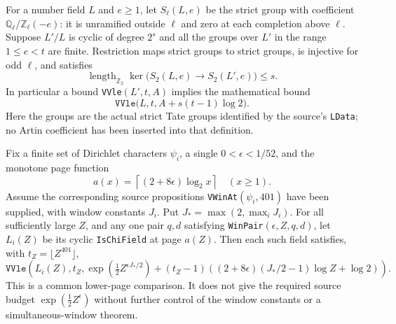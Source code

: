 \begin{proposition}
\label{AC-G31}
For a number field $L$ and $e\geq1$, let
$S_\ell(L,e)$ be the strict group with coefficient
$\mathbb Q_\ell/\mathbb Z_\ell(-e)$: it is unramified
outside $\ell$ and zero at each completion above $\ell$.
Suppose $L'/L$ is cyclic of degree $2^s$ and all the
groups over $L'$ in the range $1\leq e<t$ are finite.
Restriction maps strict groups to strict groups, is
injective for odd $\ell$, and satisfies
\[
 \operatorname{length}_{\mathbb Z_2}
       \ker\bigl(S_2(L,e)\longrightarrow S_2(L',e)\bigr)
                  \leq s.                            \tag{G31.1}
\]
In particular a bound \texttt{VVle}$(L',t,A)$ implies
the mathematical bound
\[
 \texttt{VVle}\bigl(L,t,A+s(t-1)\log2\bigr).         \tag{G31.2}
\]
Here the groups are the actual strict Tate groups identified
by the source's \texttt{LData}; no Artin coefficient has
been inserted into that definition.

Fix a finite set of Dirichlet characters $\psi_i$, a single
$0<\epsilon<1/52$, and the monotone page function
\[
 a(x)=\left\lceil(2+8\epsilon)\log_2 x\right\rceil
                         \quad(x\geq1).
\]
Assume the corresponding source propositions
\texttt{VWinAt}$(\psi_i,401)$ have been supplied, with
window constants $J_i$.  Put $J_* =\max(2,\max_i J_i)$.
For all sufficiently large $Z$, and any one pair $q,d$
satisfying \texttt{WinPair}$(\epsilon,Z,q,d)$, let
$L_i(Z)$ be its cyclic \texttt{IsChiField} at page $a(Z)$.
Then each such field satisfies, with
$t_Z=\lfloor Z^{401}\rfloor$,
\[
 \texttt{VVle}\left(L_i(Z),t_Z,
   \exp\left(\tfrac12 Z^{\epsilon J_*/2}\right)
      +(t_Z-1)\left((2+8\epsilon)(J_*/2-1)\log Z
                                      +\log2\right)\right).
                                                               \tag{G31.3}
\]
This is a common lower-page comparison.  It does not give
the required source budget
$\exp(\tfrac12 Z^\epsilon)$ without further control of
the window constants or a simultaneous-window theorem.
\end{proposition}
